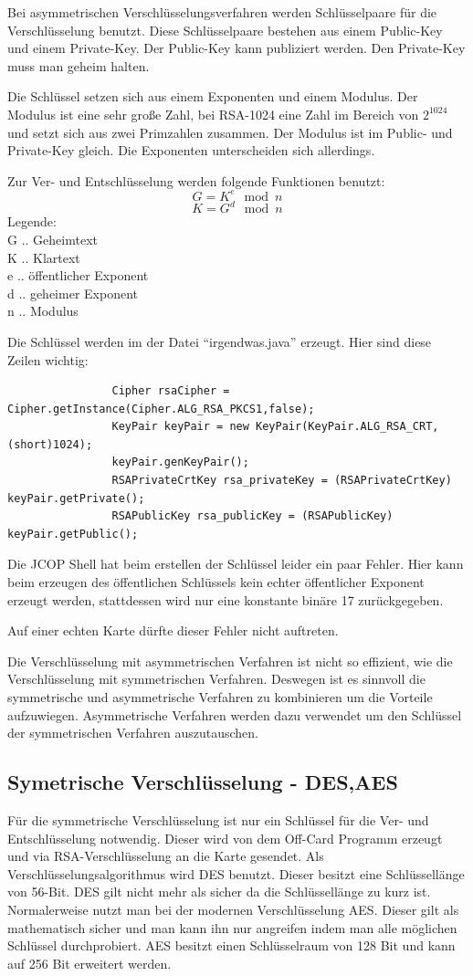 \documentclass[parskip]{scrartcl}
\begin{document}
			Bei asymmetrischen Verschlüsselungsverfahren werden Schlüsselpaare für die Verschlüsselung benutzt. Diese Schlüsselpaare bestehen aus einem Public-Key und einem Private-Key. Der Public-Key kann publiziert werden. Den Private-Key muss man geheim halten.
		
			Die Schlüssel setzen sich aus einem Exponenten und einem Modulus. Der Modulus ist eine sehr große Zahl, bei RSA-1024 eine Zahl im Bereich von $ 2^{1024} $ und setzt sich aus zwei Primzahlen zusammen. Der Modulus ist im Public- und Private-Key gleich. Die Exponenten unterscheiden sich allerdings.
		
			Zur Ver- und Entschlüsselung werden folgende Funktionen benutzt:  
			 $$ G = K^{e}\mod{n} $$
			 $$ K = G^{d}\mod{n} $$
			 Legende: \\
			 G .. Geheimtext\\
			 K .. Klartext\\
			 e .. öffentlicher Exponent\\
			 d .. geheimer Exponent\\
			 n .. Modulus
			 
			Die Schlüssel werden im der Datei \enquote{irgendwas.java} erzeugt. Hier sind diese Zeilen wichtig:
			\label{RSAKeyPair}
			\begin{lstlisting}
				Cipher rsaCipher = Cipher.getInstance(Cipher.ALG_RSA_PKCS1,false);
				KeyPair keyPair = new KeyPair(KeyPair.ALG_RSA_CRT, (short)1024);
				keyPair.genKeyPair();
				RSAPrivateCrtKey rsa_privateKey = (RSAPrivateCrtKey) keyPair.getPrivate();
				RSAPublicKey rsa_publicKey = (RSAPublicKey) keyPair.getPublic();
			\end{lstlisting}
			Die JCOP Shell hat beim erstellen der Schlüssel leider ein paar Fehler. Hier kann beim erzeugen des öffentlichen Schlüssels kein echter öffentlicher Exponent erzeugt werden, stattdessen wird nur eine konstante binäre 17 zurückgegeben.
		
			Auf einer echten Karte dürfte dieser Fehler nicht auftreten.
		
			Die Verschlüsselung mit asymmetrischen Verfahren ist nicht so effizient, wie die Verschlüsselung mit symmetrischen Verfahren. Deswegen ist es sinnvoll die symmetrische und asymmetrische Verfahren zu kombinieren um die Vorteile aufzuwiegen. Asymmetrische Verfahren werden dazu verwendet um den Schlüssel der symmetrischen Verfahren auszutauschen.
	
		\subsection{Symetrische Verschlüsselung - DES,AES}
			Für die symmetrische Verschlüsselung ist nur ein Schlüssel für die Ver- und Entschlüsselung notwendig. Dieser wird von dem Off-Card Programm erzeugt und via RSA-Verschlüsselung an die Karte gesendet. Als Verschlüsselungsalgorithmus wird DES benutzt. Dieser besitzt eine Schlüssellänge von 56-Bit. DES gilt nicht mehr als sicher da die Schlüssellänge zu kurz ist. Normalerweise nutzt man bei der modernen Verschlüsselung AES. Dieser gilt als mathematisch sicher und man kann ihn nur angreifen indem man alle möglichen Schlüssel durchprobiert. AES besitzt einen Schlüsselraum von 128 Bit und kann auf 256 Bit erweitert werden.
			
\end{document}
